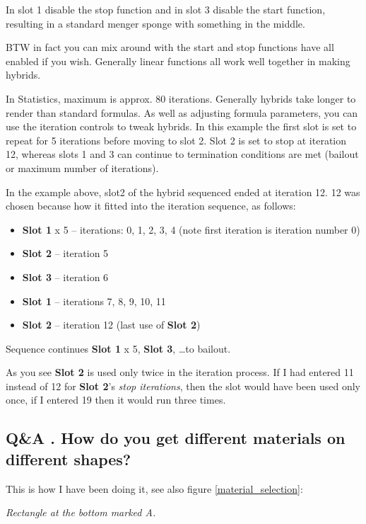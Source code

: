 In slot 1 disable the stop function
and in slot 3 disable the start function, resulting in a standard menger sponge
with something in the middle.

BTW in fact you can mix around
with the start and stop functions have all enabled if you wish. Generally linear
functions all work well together in making hybrids.

In
Statistics, maximum is approx. 80 iterations. Generally hybrids take longer to
render than standard formulas.
As well as adjusting formula parameters, you
can use the iteration controls to tweak hybrids. In this example the first slot
is set to repeat for 5 iterations before moving to slot 2. Slot 2 is set to stop
at iteration 12, whereas slots 1 and 3 can continue to termination conditions are
met (bailout or maximum number of iterations).

In the example above, slot2 of the hybrid sequenced ended at iteration 12. 12
was chosen because how it fitted into the iteration sequence, as follows:

\begin{itemize}
\item \textbf{Slot 1} x 5 -- iterations: 0, 1, 2, 3, 4 (note first iteration is iteration number 0)
\item \textbf{Slot 2} -- iteration 5
\item \textbf{Slot 3} -- iteration 6
\item \textbf{Slot 1} -- iterations 7, 8, 9, 10, 11
\item \textbf{Slot 2} -- iteration 12 (last use of \textbf{Slot 2})
\end{itemize}

Sequence continues \textbf{Slot 1} x 5, \textbf{Slot 3}, \ldots to bailout.

As you see \textbf{Slot 2} is used only twice in the iteration process. If I had entered 11 instead of 12 for \textbf{Slot 2}'s \emph{stop iterations}, then the slot would have been used only once, if I entered 19 then it would run three times.

\subsection{Q\&A . How do you get different materials on different
	shapes?}\label{qa-.-how-do-you-get-different-materials-on-different-shapes}

This is how I have been doing it, see also figure \ref{material_selection}:

\emph{Rectangle at the bottom marked A.}

